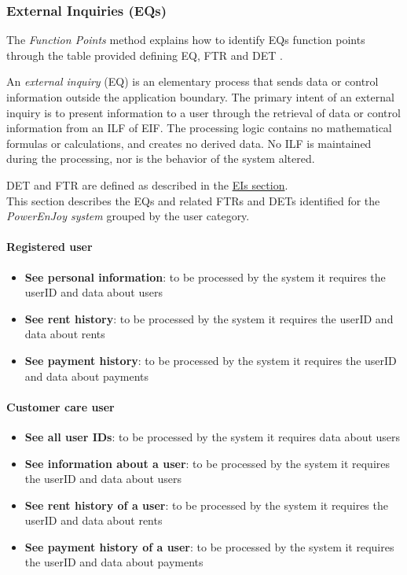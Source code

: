 \subsubsection{External Inquiries (EQs)}
The \emph{Function Points} method explains how to identify EQs function points through the table provided defining EQ, FTR and DET \cite{FP}.

An \textit{external inquiry} (EQ) is an elementary process that sends data or control information outside the application boundary. The primary intent of an external inquiry is to present information to a user through the retrieval of data or control information from an ILF of EIF. The processing logic contains no mathematical formulas or calculations, and creates no derived data. No ILF is maintained during the processing, nor is the behavior of the system
altered.

DET and FTR are defined as described in the \hyperref[sec:EIs]{EIs section}.\\

This section describes the EQs and related FTRs and DETs identified for the \emph{PowerEnJoy system} grouped by the user category.

\paragraph{Registered user}
\begin{itemize}
	\item \textbf{See personal information}: to be processed by the system it requires the userID and data about users
	\item \textbf{See rent history}: to be processed by the system it requires the userID and data about rents
	\item \textbf{See payment history}: to be processed by the system it requires the userID and data about payments
\end{itemize}

\paragraph{Customer care user}
\begin{itemize}
	\item \textbf{See all user IDs}:  to be processed by the system it requires data about users
	\item \textbf{See information about a user}: to be processed by the system it requires the userID and data about users
	\item \textbf{See rent history of a user}: to be processed by the system it requires the userID and data about rents
	\item \textbf{See payment history of a user}: to be processed by the system it requires the userID and data about payments
\end{itemize}


